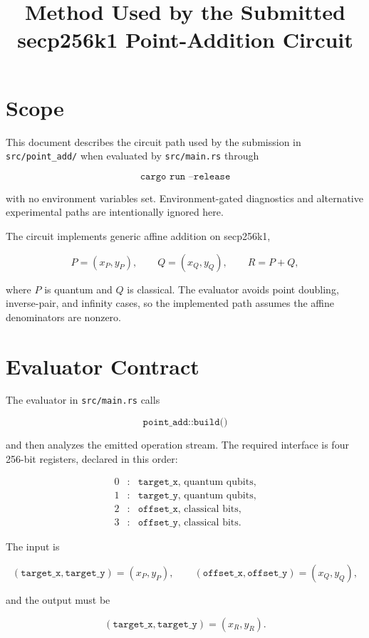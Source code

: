 \documentclass[11pt]{article}
\title{Method Used by the Submitted secp256k1 Point-Addition Circuit}
\author{}
\date{}
\begin{document}
\maketitle

\section{Scope}

This document describes the circuit path used by the submission in
\texttt{src/point\_add/} when evaluated by \texttt{src/main.rs} through

\[
\texttt{cargo run --release}
\]

with no environment variables set.  Environment-gated diagnostics and
alternative experimental paths are intentionally ignored here.

The circuit implements generic affine addition on secp256k1,

\[
P=(x_P,y_P),\qquad Q=(x_Q,y_Q),\qquad R=P+Q,
\]

where \(P\) is quantum and \(Q\) is classical.  The evaluator avoids point
doubling, inverse-pair, and infinity cases, so the implemented path assumes the
affine denominators are nonzero.

\section{Evaluator Contract}

The evaluator in \texttt{src/main.rs} calls

\[
\texttt{point\_add::build()}
\]

and then analyzes the emitted operation stream.  The required interface is four
256-bit registers, declared in this order:

\[
\begin{array}{ccl}
0 &:& \texttt{target\_x} \text{, quantum qubits},\\
1 &:& \texttt{target\_y} \text{, quantum qubits},\\
2 &:& \texttt{offset\_x} \text{, classical bits},\\
3 &:& \texttt{offset\_y} \text{, classical bits}.
\end{array}
\]

The input is

\[
(\texttt{target\_x},\texttt{target\_y})=(x_P,y_P),
\qquad
(\texttt{offset\_x},\texttt{offset\_y})=(x_Q,y_Q),
\]

and the output must be

\[
(\texttt{target\_x},\texttt{target\_y})=(x_R,y_R).
\]
\end{document}
